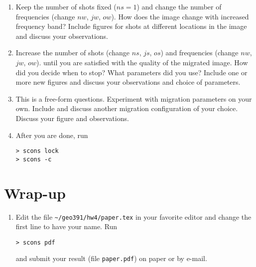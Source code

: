 \begin{enumerate}

\item
Keep the number of shots fixed ($ns=1$) 
and change the number of frequencies 
(change $nw$, $jw$, $ow$).
How does the image change with increased frequency band?
Include figures for shots at different locations in the 
image and discuss your observations.


\item
Increase the number of shots 
(change $ns$, $js$, $os$)
and frequencies 
(change $nw$, $jw$, $ow$).
until you are satisfied with the quality of the migrated image.
How did you decide when to stop?
What parameters did you use?
Include one or more new figures and discuss your 
observations and choice of parameters.


\item
This is a free-form questions.
Experiment with migration parameters on your own.
Include and discuss another migration configuration
of your choice. Discuss your figure and observations.


\item After you are done, run

\begin{verbatim}
> scons lock
> scons -c
\end{verbatim} 
  
\end{enumerate}


\section{}


\section{Wrap-up}

\begin{enumerate}  
\item 
Edit the file
\verb#~/geo391/hw4/paper.tex# in your favorite editor and change the
first line to have your name. Run
\begin{verbatim}
> scons pdf
\end{verbatim}
and submit your result (file \texttt{paper.pdf}) on paper or by
e-mail.

\end{enumerate}
